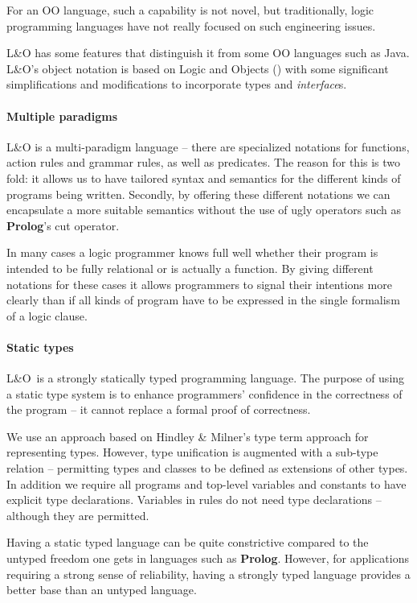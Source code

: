 For an OO language, such a capability is not novel, but traditionally, logic programming languages have not really focused on such engineering issues.

L&O has some features that distinguish it from some OO languages such as Java\tm. L&O's object notation is based on Logic and Objects (\cite{fgm:92}) with some significant simplifications and modifications to incorporate types and  \textit{interface}s.

\paragraph{Multiple paradigms}
L&O is a multi-paradigm language -- there are specialized notations for  functions, action rules and grammar rules, as well as predicates. The reason for this is two fold: it allows us to have tailored syntax and semantics for the different kinds of programs being written. Secondly, by offering these different notations we can encapsulate a more suitable semantics without the use of ugly operators such as \textbf{Prolog}'s cut operator.

In many cases a logic programmer knows full well whether their program is intended to be fully relational or is actually a function. By giving different notations for these cases it allows programmers to signal their intentions more clearly than if all kinds of program have to be expressed in the single formalism of a logic clause.

\paragraph{Static types}
L&O\ is a strongly statically typed programming language. The purpose of using a static type system is to enhance programmers' confidence in the correctness of the program -- it cannot replace a formal proof of correctness.

We use an approach based on Hindley \& Milner's \cite{hindley:69} type term approach for representing types. However, type unification is augmented with a sub-type relation -- permitting types and classes to be defined as extensions of other types. In addition we require all programs and top-level variables and constants to have explicit type declarations. Variables in rules do not need type declarations -- although they are permitted.

Having a static typed language can be quite constrictive compared to the untyped freedom one gets in languages such as \textbf{Prolog}.  However, for applications requiring a strong sense of reliability, having a strongly typed language provides a better base than an untyped language.

